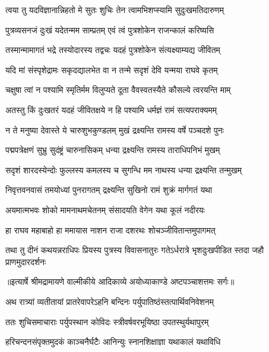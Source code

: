 \twolineshloka
{त्वया तु यदविज्ञानान्निहतो मे सुतः शुचिः}
{तेन त्वामभिशप्स्यामि सुदुःखमतिदारुणम्} %

\twolineshloka
{पुत्रव्यसनजं दुःखं यदेतन्मम साम्प्रतम्}
{एवं त्वं पुत्रशोकेन राजन्कालं करिष्यसि} %

\twolineshloka
{तस्मान्मामागतं भद्रे तस्योदारस्य तद्वचः}
{यदहं पुत्रशोकेन संत्यक्ष्याम्यद्य जीवितम्} %

\twolineshloka
{यदि मां संस्पृशेद्रामः सकृदद्यालभेत वा}
{न तन्मे सदृशं देवि यन्मया राघवे कृतम्} %

\twolineshloka
{चक्षुषा त्वां न पश्यामि स्मृतिर्मम विलुप्यते}
{दूता वैवस्वतस्यैते कौसल्ये त्वरयन्ति माम्} %

\twolineshloka
{अतस्तु किं दुःखतरं यदहं जीवितक्षये}
{न हि पश्यामि धर्मज्ञं रामं सत्यपराक्यमम्} %

\twolineshloka
{न ते मनुष्या देवास्ते ये चारुशुभकुण्डलम्}
{मुखं द्रक्ष्यन्ति रामस्य वर्षे पञ्चदशे पुनः} %

\twolineshloka
{पद्मपत्रेक्षणं सुभ्रु सुदंष्ट्रं चारुनासिकम्}
{धन्या द्रक्ष्यन्ति रामस्य ताराधिपनिभं मुखम्} %

\twolineshloka
{सदृशं शारदस्येन्दोः फुल्लस्य कमलस्य च}
{सुगन्धि मम नाथस्य धन्या द्रक्ष्यन्ति तन्मुखम्} %

\twolineshloka
{निवृत्तवनवासं तमयोध्यां पुनरागतम्}
{द्रक्ष्यन्ति सुखिनो रामं शुक्रं मार्गगतं यथा} %

\twolineshloka
{अयमात्मभवः शोको मामनाथमचेतनम्}
{संसादयति वेगेन यथा कूलं नदीरयः} %

\twolineshloka
{हा राघव महाबाहो हा ममायास नाशन}
{राजा दशरथः शोचञ्जीवितान्तमुपागमत्} %

\fourlineindentedshloka
{तथा तु दीनं कथयन्नराधिपः}
{ प्रियस्य पुत्रस्य विवासनातुरः}
{गतेऽर्धरात्रे भृशदुःखपीडित}
{स्तदा जहौ प्राणमुदारदर्शनः} %


{॥इत्यार्षे श्रीमद्रामायणे वाल्मीकीये आदिकाव्ये अयोध्याकाण्डे अष्टपञ्चाशत्तमः सर्गः॥}


\twolineshloka
{अथ रात्र्यां व्यतीतायां प्रातरेवापरेऽहनि}
{बन्दिनः पर्युपातिष्ठंस्तत्पार्थिवनिवेशनम्} %

\twolineshloka
{ततः शुचिसमाचाराः पर्युपस्थान कोविदः}
{स्त्रीवर्षवरभूयिष्ठा उपतस्थुर्यथापुरम्} %

\twolineshloka
{हरिचन्दनसंपृक्तमुदकं काञ्चनैर्घटैः}
{आनिन्युः स्नानशिक्षाज्ञा यथाकालं यथाविधि} %


